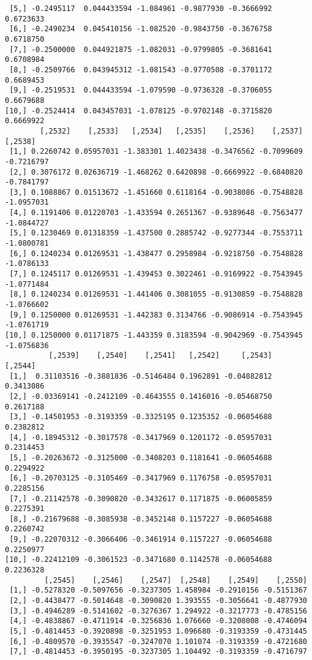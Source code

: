 \documentclass[
  letterpaper,
  DIV=11,
  numbers=noendperiod]{scrreprt}
\begin{document}
\begin{verbatim}
 [5,] -0.2495117  0.044433594 -1.084961 -0.9877930 -0.3666992 0.6723633
 [6,] -0.2490234  0.045410156 -1.082520 -0.9843750 -0.3676758 0.6718750
 [7,] -0.2500000  0.044921875 -1.082031 -0.9799805 -0.3681641 0.6708984
 [8,] -0.2509766  0.043945312 -1.081543 -0.9770508 -0.3701172 0.6689453
 [9,] -0.2519531  0.044433594 -1.079590 -0.9736328 -0.3706055 0.6679688
[10,] -0.2524414  0.043457031 -1.078125 -0.9702148 -0.3715820 0.6669922
        [,2532]    [,2533]   [,2534]   [,2535]    [,2536]    [,2537]    [,2538]
 [1,] 0.2260742 0.05957031 -1.383301 1.4023438 -0.3476562 -0.7099609 -0.7216797
 [2,] 0.3076172 0.02636719 -1.468262 0.6420898 -0.6669922 -0.6840820 -0.7841797
 [3,] 0.1088867 0.01513672 -1.451660 0.6118164 -0.9038086 -0.7548828 -1.0957031
 [4,] 0.1191406 0.01220703 -1.433594 0.2651367 -0.9389648 -0.7563477 -1.0844727
 [5,] 0.1230469 0.01318359 -1.437500 0.2885742 -0.9277344 -0.7553711 -1.0800781
 [6,] 0.1240234 0.01269531 -1.438477 0.2958984 -0.9218750 -0.7548828 -1.0786133
 [7,] 0.1245117 0.01269531 -1.439453 0.3022461 -0.9169922 -0.7543945 -1.0771484
 [8,] 0.1240234 0.01269531 -1.441406 0.3081055 -0.9130859 -0.7548828 -1.0766602
 [9,] 0.1250000 0.01269531 -1.442383 0.3134766 -0.9086914 -0.7543945 -1.0761719
[10,] 0.1250000 0.01171875 -1.443359 0.3183594 -0.9042969 -0.7543945 -1.0756836
          [,2539]    [,2540]    [,2541]   [,2542]     [,2543]   [,2544]
 [1,]  0.31103516 -0.3881836 -0.5146484 0.1962891 -0.04882812 0.3413086
 [2,] -0.03369141 -0.2412109 -0.4643555 0.1416016 -0.05468750 0.2617188
 [3,] -0.14501953 -0.3193359 -0.3325195 0.1235352 -0.06054688 0.2382812
 [4,] -0.18945312 -0.3017578 -0.3417969 0.1201172 -0.05957031 0.2314453
 [5,] -0.20263672 -0.3125000 -0.3408203 0.1181641 -0.06054688 0.2294922
 [6,] -0.20703125 -0.3105469 -0.3417969 0.1176758 -0.05957031 0.2285156
 [7,] -0.21142578 -0.3090820 -0.3432617 0.1171875 -0.06005859 0.2275391
 [8,] -0.21679688 -0.3085938 -0.3452148 0.1157227 -0.06054688 0.2260742
 [9,] -0.22070312 -0.3066406 -0.3461914 0.1157227 -0.06054688 0.2250977
[10,] -0.22412109 -0.3061523 -0.3471680 0.1142578 -0.06054688 0.2236328
         [,2545]    [,2546]    [,2547]  [,2548]    [,2549]    [,2550]
 [1,] -0.5278320 -0.5097656 -0.3237305 1.458984 -0.2910156 -0.5151367
 [2,] -0.4438477 -0.5014648 -0.3090820 1.393555 -0.3056641 -0.4877930
 [3,] -0.4946289 -0.5141602 -0.3276367 1.294922 -0.3217773 -0.4785156
 [4,] -0.4838867 -0.4711914 -0.3256836 1.076660 -0.3208008 -0.4746094
 [5,] -0.4814453 -0.3920898 -0.3251953 1.096680 -0.3193359 -0.4731445
 [6,] -0.4809570 -0.3935547 -0.3247070 1.101074 -0.3193359 -0.4721680
 [7,] -0.4814453 -0.3950195 -0.3237305 1.104492 -0.3193359 -0.4716797

\end{verbatim}
\end{document}
